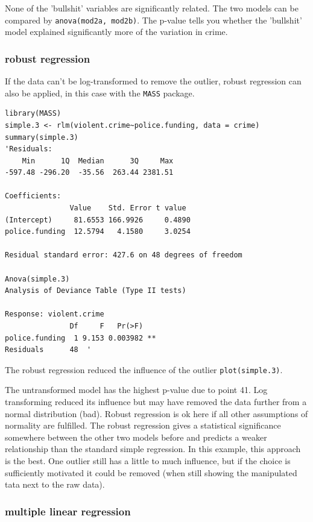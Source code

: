 \documentclass{article}
\begin{document}
None of the 'bullshit' variables are significantly related. The two models can be compared by \texttt{anova(mod2a, mod2b)}. The p-value tells you whether the 'bullshit' model explained significantly more of the variation in crime.

\subsubsection{robust regression}
If the data can't be log-transformed to remove the outlier, robust regression can also be applied, in this case with the \texttt{MASS} package.

\begin{lstlisting}
library(MASS)
simple.3 <- rlm(violent.crime~police.funding, data = crime)
summary(simple.3)
'Residuals:
    Min      1Q  Median      3Q     Max 
-597.48 -296.20  -35.56  263.44 2381.51 

Coefficients:
               Value    Std. Error t value 
(Intercept)     81.6553 166.9926     0.4890
police.funding  12.5794   4.1580     3.0254

Residual standard error: 427.6 on 48 degrees of freedom

Anova(simple.3)
Analysis of Deviance Table (Type II tests)

Response: violent.crime
               Df     F   Pr(>F)   
police.funding  1 9.153 0.003982 **
Residuals      48  '
\end{lstlisting}

The robust regression reduced the influence of the outlier \texttt{plot(simple.3)}.\par 
The untransformed model has the highest p-value due to point 41. Log transforming reduced its influence but may have removed the data further from a normal distribution (bad). Robust regression is ok here if all other assumptions of normality are fulfilled. The robust regression gives a statistical significance somewhere between the other two models before and predicts a weaker relationship than the standard simple regression. In this example, this approach is the best. One outlier still has a little to much influence, but if the choice is sufficiently motivated it could be removed (when still showing the manipulated tata next to the raw data).

\subsubsection{multiple linear regression}
\end{document}
